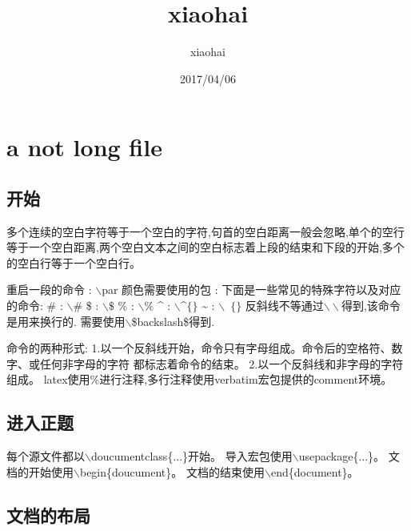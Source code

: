 \documentclass[11pt,a4paper,UTF8]{ctexbook}
\author{xiaohai}
\date{2017/04/06}
\title{xiaohai}
\begin{document}
\maketitle
\tableofcontents

\chapter{a not long file}
\section{开始}
多个连续的空白字符等于一个空白的字符,句首的空白距离一般会忽略,单个的空行
等于一个空白距离,两个空白文本之间的空白标志着上段的结束和下段的开始,多个
的空白行等于一个空白行。

\noindent 重启一段的命令{} : {\color{red}$\backslash$par}\newline
颜色需要使用的包 : {\color{red}{xcolor}}\newline
下面是一些常见的特殊字符以及对应的命令:\newline
\# : {\color{red}$\backslash\#$}\newline
\$ : {\color{red}$\backslash\$$}\newline
\% : {\color{red}$\backslash\%$}\newline
\^{} : {\color{red}$\backslash$\^{}$\{\}$}\newline
\~{} : {\color{red}$\backslash$~$\{\}$}\newline
反斜线不等通过$\backslash\backslash$得到,该命令是用来换行的.
需要使用$\backslash$\$backslash\$得到.\newline

命令的两种形式:\newline
1.以一个反斜线开始，命令只有字母组成。命令后的空格符、数字、或任何非字母的字符
都标志着命令的结束。\newline
2.以一个反斜线和非字母的字符组成。\newline
latex使用\%进行注释,多行注释使用verbatim宏包提供的comment环境。\newline

\section{进入正题}
每个源文件都以$\backslash$doucumentclass\{...\}开始。\newline
导入宏包使用$\backslash$usepackage\{...\}。\newline
文档的开始使用$\backslash$begin\{doucument\}。\newline
文档的结束使用$\backslash$end\{document\}。\newline

\section{文档的布局}
\end{document}
